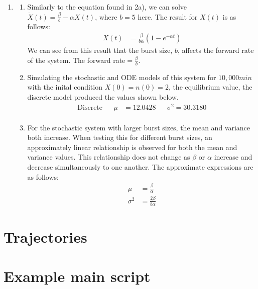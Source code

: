 \documentclass[10pt]{article}
\begin{document}
\begin{enumerate}
\item \begin{enumerate}
\item Similarly to the equation found in 2a), we can solve $ \dot{X}(t) = \frac{\beta}{b} - \alpha X(t) $, where $b=5$ here. The result for $X(t)$ is as follows: \begin{align*} X(t) &= \frac{\beta}{b \alpha} (1 - e^{-\alpha t})\end{align*}
We can see from this result that the burst size, $b$, affects the forward rate of the system. The forward rate$ = \frac{\beta}{b}$.
\item Simulating the stochastic and ODE models of this system for $10,000 min$ with the inital condition $X(0) = n(0) = 2$, the equilibrium value, the discrete model produced the values shown below. \begin{align*} \text{Discrete} && \mu &= 12.0428 && \sigma^2 = 30.3180 \\ \end{align*}
\item For the stochastic system with larger burst sizes, the mean and variance both increase. When testing this for different burst sizes, an approximately linear relationship is observed for both the mean and variance values. This relationship does not change as $\beta$ or $\alpha$ increase and decrease simultaneously to one another. The approximate expressions are as follows: \begin{align*} \mu &= \frac{\beta}{\alpha}\\ \sigma^2 &= \frac{2 \beta}{b \alpha} \end{align*}
\end{enumerate}
\end{enumerate}
\newpage
\begin{appendices}
\section{Trajectories}

\section{Example main script}

\end{appendices}
\end{document}
